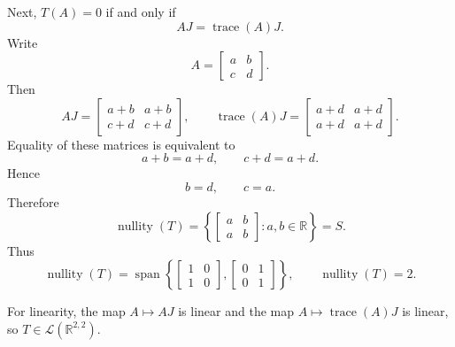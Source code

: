 \documentclass[12pt]{article}
\newcommand{\R}{\mathbb{R}}
\newcommand{\cL}{\mathcal{L}}
\DeclareMathOperator{\Nullity}{nullity}
\DeclareMathOperator{\Null}{nullity}
\DeclareMathOperator{\tr}{trace}
\begin{document}
Next, \(T(A)=0\) if and only if
\[
AJ=\tr(A)J.
\]
Write
\[
A=\begin{bmatrix}a&b\\c&d\end{bmatrix}.
\]
Then
\[
AJ=
\begin{bmatrix}
a+b&a+b\\
c+d&c+d
\end{bmatrix},
\qquad
\tr(A)J=
\begin{bmatrix}
a+d&a+d\\
a+d&a+d
\end{bmatrix}.
\]
Equality of these matrices is equivalent to
\[
a+b=a+d,
\qquad
c+d=a+d.
\]
Hence
\[
b=d,
\qquad
c=a.
\]
Therefore
\[
\Null(T)=
\left\{
\begin{bmatrix}a&b\\a&b\end{bmatrix}:a,b\in\R
\right\}
=S.
\]
Thus
\[
\boxed{
\Null(T)=
\operatorname{span}\left\{
\begin{bmatrix}1&0\\1&0\end{bmatrix},
\begin{bmatrix}0&1\\0&1\end{bmatrix}
\right\},
\qquad
\Nullity(T)=2.}
\]

For linearity, the map \(A\mapsto AJ\) is linear and the map \(A\mapsto \tr(A)J\) is linear, so \(T\in\cL(\R^{2,2})\).
\end{document}
